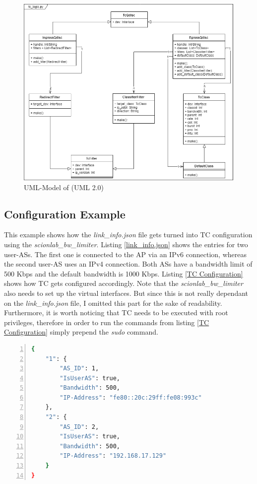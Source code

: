 \begin{figure}[h]
	\centering
  	\includegraphics[width=\textwidth]{img/tc_logic_uml.png}
    \caption{UML-Model of  (UML 2.0)}
    \label{tc logic uml}
\end{figure}

\newpage
\textit{ }
\newpage
\subsection{Configuration Example}

This example shows how the \textit{link\_info.json} file gets turned into \acs{TC} configuration using the \textit{scionlab\_bw\_limiter}. Listing \ref{link_info.json} shows the entries for two user-\acsp{AS}.  The first one is connected to the \acs{AP} via an \acs{IP}v6 connection, whereas the second user-\acs{AS} uses an \acs{IP}v4 connection. Both \acsp{AS} have a bandwidth limit of 500 Kbps and the default bandwidth is 1000 Kbps. Listing \ref{TC Configuration} shows how \acs{TC} gets configured accordingly. Note that the \textit{scionlab\_bw\_limiter} also needs to set up the virtual interfaces. But since this is not really dependant on the \textit{link\_info.json} file, I omitted this part for the sake of readability. Furthermore, it is worth noticing that \acs{TC} needs to be executed with root privileges, therefore in order to run the commands from listing \ref{TC Configuration} simply prepend the \textit{sudo} command.

\begin{lstlisting}[language=sh, caption = link\_info.json, captionpos=b, numbers=left, frame=single, breaklines=true, breakatwhitespace=true, showstringspaces=false, label=link_info.json]
{
    "1": {
        "AS_ID": 1,
        "IsUserAS": true,
        "Bandwidth": 500,
        "IP-Address": "fe80::20c:29ff:fe08:993c"
    },
    "2": {
        "AS_ID": 2,
        "IsUserAS": true,
        "Bandwidth": 500,
        "IP-Address": "192.168.17.129"
    }
}
\end{lstlisting}

